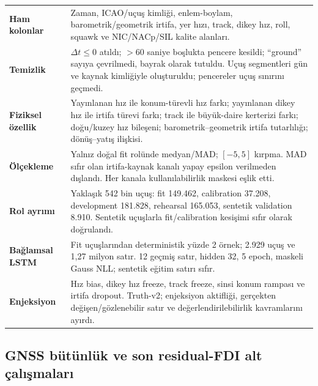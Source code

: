 \documentclass[10pt,a4paper]{article}
\begin{document}
\begin{tabularx}{\textwidth}{>{\bfseries}p{}X}
Ham kolonlar & Zaman, ICAO/uçuş kimliği, enlem-boylam, barometrik/geometrik
irtifa, yer hızı, track, dikey hız, roll, squawk ve NIC/NACp/SIL kalite alanları. \\
Temizlik & $\Delta t\leq0$ atıldı; $>60$ saniye boşlukta pencere kesildi;
``ground'' sayıya çevrilmedi, bayrak olarak tutuldu. Uçuş segmentleri gün ve
kaynak kimliğiyle oluşturuldu; pencereler uçuş sınırını geçmedi. \\
Fiziksel özellik & Yayınlanan hız ile konum-türevli hız farkı; yayınlanan dikey
hız ile irtifa türevi farkı; track ile büyük-daire kerterizi farkı; doğu/kuzey
hız bileşeni; barometrik--geometrik irtifa tutarlılığı; dönüş--yatış ilişkisi. \\
Ölçekleme & Yalnız doğal fit rolünde medyan/MAD; $[-5,5]$ kırpma. MAD sıfır olan
irtifa-kaynak kanalı yapay epsilon verilmeden dışlandı. Her kanala
kullanılabilirlik maskesi eşlik etti. \\
Rol ayrımı & Yaklaşık 542 bin uçuş: fit 149.462, calibration 37.208,
development 181.828, rehearsal 165.053, sentetik validation 8.910. Sentetik
uçuşlarla fit/calibration kesişimi sıfır olarak doğrulandı. \\
Bağlamsal LSTM & Fit uçuşlarından deterministik yüzde 2 örnek; 2.929 uçuş ve
1,27 milyon satır. 12 geçmiş satır, hidden 32, 5 epoch, maskeli Gauss NLL;
sentetik eğitim satırı sıfır. \\
Enjeksiyon & Hız bias, dikey hız freeze, track freeze, sinsi konum rampası ve
irtifa dropout. Truth-v2; enjeksiyon aktifliği, gerçekten değişen/gözlenebilir
satır ve değerlendirilebilirlik kavramlarını ayırdı. \\
\end{tabularx}

\subsection{GNSS bütünlük ve son residual-FDI alt çalışmaları}
\end{document}
